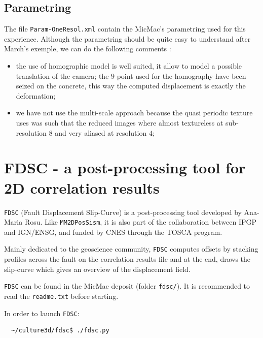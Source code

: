 \subsection{Parametring}


The file {\tt Param-OneResol.xml} contain the MicMac's parametring used for this experience.
Although the parametring should be quite easy to understand after March's exemple, we can
do the following comments :

\begin{itemize}
    \item  the use of homographic model is well suited, it allow to model a possible translation
          of the camera; the $9$ point used for the homography have been seized on the concrete, this
          way the computed displacement is exactly the deformation;

    \item  we have not use the multi-scale approach because the quasi periodic texture uses was
           such that the reduced images where almost textureless at sub-resolution $8$ and very
           aliased at resolution $4$;
\end{itemize}



\section{FDSC - a post-processing tool for 2D correlation results}

\verb+FDSC+ (Fault Displacement Slip-Curve) is a post-processing tool developed by Ana-Maria Rosu.
Like \verb+MM2DPosSism+, it is also part of the collaboration between IPGP and IGN/ENSG, and funded by CNES through the TOSCA program.

Mainly dedicated to the geoscience community, \verb+FDSC+ computes offsets by stacking profiles across the fault on the correlation results file and at the end, draws the slip-curve which gives an overview of the displacement field.

\verb+FDSC+ can be found in the MicMac deposit (folder \verb+fdsc/+). It is recommended to read the \verb+readme.txt+ before starting.

In order to launch \verb+FDSC+:
\begin{verbatim}
  ~/culture3d/fdsc$ ./fdsc.py
\end{verbatim}


